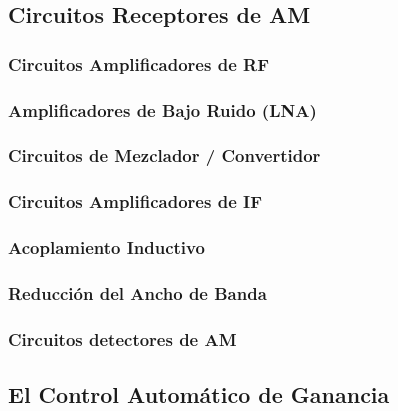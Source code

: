 \documentclass[12pt,letterpaper,titlepage,twoside]{book}
\begin{document}
\subsection{Circuitos Receptores de AM}
\subsubsection{Circuitos Amplificadores de RF}
\subsubsection{Amplificadores de Bajo Ruido (LNA)}
\subsubsection{Circuitos de Mezclador / Convertidor}
\subsubsection{Circuitos Amplificadores de IF}
\subsubsection{Acoplamiento Inductivo}


\subsubsection{Reducción del Ancho de Banda}
\subsubsection{Circuitos detectores de AM}
\subsection{El Control Automático de Ganancia}
	
\end{document}

